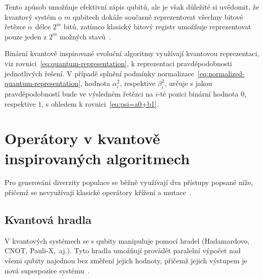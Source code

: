 Tento způsob umožňuje efektivní zápis qubitů, ale je však důležité si uvědomit, že kvantový systém o $m$ qubitech dokáže současně reprezentovat všechny bitové řetězce o~délce $2^m$ bitů, zatímco klasický bitový registr umožňuje reprezentovat pouze jeden z $2^m$ možných stavů~\cite{NaturalComputing}. 

Binární kvantově inspirované evoluční algoritmy využívají kvantovou reprezentaci, viz rovnici~\ref{eq:quantum-representation}, k reprezentaci pravděpodobnosti jednotlivých řešení. 
V případě splnění podmínky normalizace~\ref{eq:normalized-quantum-representation}, hodnota $\alpha^2_i$, respektive $\beta^2_i$, určuje s jakou pravděpodobností bude ve výsledném řetězci na $i$-té pozici binární hodnota $0$, respektive $1$, s ohledem k rovnici~\ref{eq:psi=a0+b1}.

\section{Operátory v kvantově inspirovaných algoritmech}
Pro generování diverzity populace se běžně využívají dva přístupy popsané níže, přičemž se nevyužívají klasické operátory křížení a mutace~\cite{NaturalComputing}.

\subsection{Kvantová hradla}\label{subsec:quantum-gates}
V kvantových systémech se s qubity manipuluje pomocí hradel (Hadamardovo, CNOT, Pauli-X,~aj.). 
Tyto hradla umožňují provádět paralelní výpočet nad všemi qubity najednou bez změření jejich hodnoty, přičemž jejich výstupem je nová superpozice systému~\cite{NaturalComputing,QuantumComputing-Curious,QuantumComputing-QuantumInformation}. 

